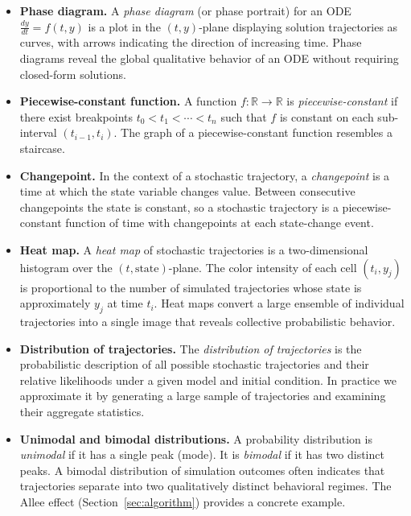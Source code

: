 \begin{itemize}
\item \textbf{Phase diagram.} A \textit{phase diagram} (or phase portrait) for an ODE $\frac{dy}{dt}=f(t,y)$ is a plot in the $(t,y)$-plane displaying solution trajectories as curves, with arrows indicating the direction of increasing time. Phase diagrams reveal the global qualitative behavior of an ODE without requiring closed-form solutions.

\item \textbf{Piecewise-constant function.} A function $f:\mathbb{R}\to\mathbb{R}$ is \textit{piecewise-constant} if there exist breakpoints $t_0<t_1<\cdots<t_n$ such that $f$ is constant on each sub-interval $(t_{i-1},t_i)$. The graph of a piecewise-constant function resembles a staircase.

\item \textbf{Changepoint.} In the context of a stochastic trajectory, a \textit{changepoint} is a time at which the state variable changes value. Between consecutive changepoints the state is constant, so a stochastic trajectory is a piecewise-constant function of time with changepoints at each state-change event.

\item \textbf{Heat map.} A \textit{heat map} of stochastic trajectories is a two-dimensional histogram over the $(t,\text{state})$-plane. The color intensity of each cell $(t_i, y_j)$ is proportional to the number of simulated trajectories whose state is approximately $y_j$ at time $t_i$. Heat maps convert a large ensemble of individual trajectories into a single image that reveals collective probabilistic behavior.

\item \textbf{Distribution of trajectories.} The \textit{distribution of trajectories} is the probabilistic description of all possible stochastic trajectories and their relative likelihoods under a given model and initial condition. In practice we approximate it by generating a large sample of trajectories and examining their aggregate statistics.

\item \textbf{Unimodal and bimodal distributions.} A probability distribution is \textit{unimodal} if it has a single peak (mode). It is \textit{bimodal} if it has two distinct peaks. A bimodal distribution of simulation outcomes often indicates that trajectories separate into two qualitatively distinct behavioral regimes. The Allee effect (Section~\ref{sec:algorithm}) provides a concrete example.


\end{itemize}
